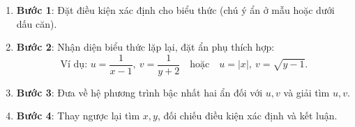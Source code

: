 \begin{enumerate}
\item \textbf{Bước 1}: Đặt điều kiện xác định cho biểu thức (chú ý ẩn ở mẫu hoặc dưới dấu căn).
\item \textbf{Bước 2}: Nhận diện biểu thức lặp lại, đặt ẩn phụ thích hợp:
$$\text{Ví dụ: } u = \dfrac{1}{x-1},\ v = \dfrac{1}{y+2}\quad \text{hoặc}\quad u = |x|,\ v = \sqrt{y-1}.$$
\item \textbf{Bước 3}: Đưa về hệ phương trình bậc nhất hai ẩn đối với $u, v$ và giải tìm $u, v$.
\item \textbf{Bước 4}: Thay ngược lại tìm $x, y$, đối chiếu điều kiện xác định và kết luận.
\end{enumerate}
